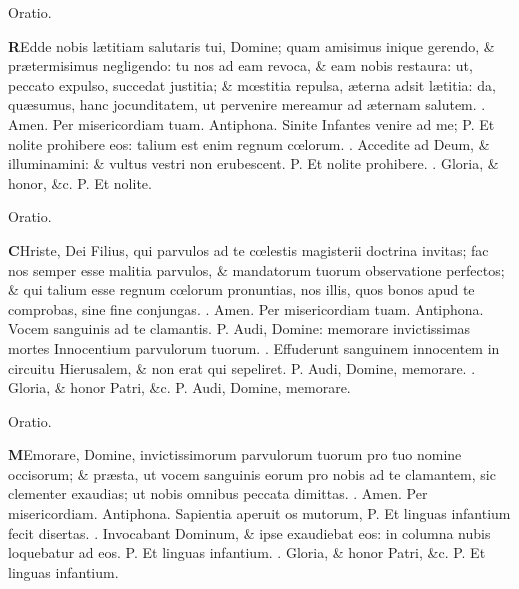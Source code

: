 \documentclass[letter,11pt]{book}
\makeatletter
\DeclareRobustCommand{\Vbar}{\vers@resp{-0.1em}{V}}
\DeclareRobustCommand{\Rbar}{\vers@resp{0pt}{R}}
\newcommand{\vers@resp@sym}{\raisebox{0.2ex}{\rotatebox[origin=c]{-20}{$\m@th\rceil$}}}
\newcommand{\vers@resp}[2]{%
  {\ooalign{\hidewidth\kern#1\vers@resp@sym\hidewidth\cr#2\cr}}%
}%
\def\P{\color{Red} P. \color{black}}
\def\V{\color{Red} \Vbar . \color{black}}
\def\R{\color{Red} \Rbar . \color{black}}
\makeatother
\begin{document}
\begin{multicols*}{2}
\vspace{-1.5em} \begin{center} \color{Red} Oratio. \color{black} \end{center} \vspace{-.5em}
\lettrine[lines=2]{\bfseries \color{Red} R}{}Edde nobis l\ae titiam salutaris tui, Domine; quam amisimus inique
gerendo, \& pr\ae termisimus negligendo: tu nos ad eam revoca, \& eam nobis restaura: ut, peccato expulso, succedat justitia; \& m\oe stitia repulsa, \ae terna adsit l\ae titia: da, qu\ae sumus, hanc jocunditatem, ut pervenire mereamur ad \ae ternam salutem. \R Amen. Per misericordiam tuam.
\newline \color{Red} Antiphona. \color{black} Sinite Infantes venire ad me; \P Et nolite prohibere eos: talium est enim regnum c\oe lorum. \V Accedite ad Deum, \& illuminamini: \& vultus vestri non erubescent. \P Et nolite prohibere. \V Gloria, \& honor, \&c. \P Et nolite.
\vspace{-.5em} \begin{center} \color{Red} Oratio. \color{black} \end{center} \vspace{-.5em}
\lettrine[lines=2]{\bfseries \color{Red} C}{}Hriste, Dei Filius, qui parvulos ad te c\oe lestis magisterii doctrina invitas; fac nos semper esse malitia parvulos, \& mandatorum tuorum observatione perfectos; \& qui talium esse regnum c\oe lorum pronuntias, nos illis, quos bonos apud te comprobas, sine fine conjungas. \R Amen. Per misericordiam tuam.
\newline \color{Red} Antiphona. \color{black} Vocem sanguinis ad te clamantis. \P Audi, Domine: memorare invictissimas mortes Innocentium parvulorum tuorum. \V Effuderunt sanguinem innocentem in circuitu Hierusalem, \& non erat qui sepeliret. \P Audi, Domine, memorare. \V Gloria, \& honor Patri, \&c. \P Audi, Domine, memorare.
\vspace{-.5em} \begin{center} \color{Red} Oratio. \color{black} \end{center} \vspace{-.5em}
\lettrine[lines=2]{\bfseries \color{Red} M}{}Emorare, Domine, invictissimorum parvulorum tuorum pro tuo nomine occisorum; \& pr\ae sta, ut vocem sanguinis eorum pro nobis ad te clamantem, sic clementer exaudias; ut nobis omnibus peccata dimittas. \R Amen. Per misericordiam.
\newline \color{Red} Antiphona. \color{black} Sapientia aperuit os mutorum, \P Et linguas infantium fecit disertas. \V Invocabant Dominum, \& ipse exaudiebat eos: in columna nubis loquebatur ad eos. \P Et linguas infantium. \V Gloria, \& honor Patri, \&c. \P Et linguas infantium.

\end{multicols*}
\end{document}
